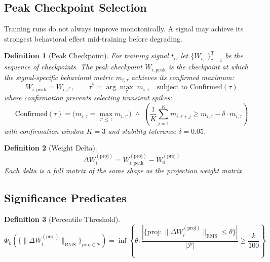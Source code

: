 \documentclass[11pt]{article}
\newtheorem{definition}{Definition}[section]
\begin{document}
\subsection{Peak Checkpoint Selection}

Training runs do not always improve monotonically. A signal may achieve its strongest behavioral effect mid-training before degrading.

\begin{definition}[Peak Checkpoint]
\label{def:peak-checkpoint}
For training signal $t_i$, let $\{W_{i,\tau}\}_{\tau=1}^{T}$ be the sequence of checkpoints. The peak checkpoint $W_{i,\text{peak}}$ is the checkpoint at which the signal-specific behavioral metric $m_{i,\tau}$ achieves its confirmed maximum:
\begin{equation}
W_{i,\text{peak}} = W_{i,\tau^*}, \qquad \tau^* = \arg\max_\tau\; m_{i,\tau} \quad \text{subject to Confirmed}(\tau)
\end{equation}
where confirmation prevents selecting transient spikes:
\begin{equation}
\text{Confirmed}(\tau) = \bigl(m_{i,\tau} = \max_{\tau' \leq \tau} m_{i,\tau'}\bigr) \;\wedge\; \left(\frac{1}{K}\sum_{j=1}^{K} m_{i,\tau+j} \geq m_{i,\tau} - \delta \cdot m_{i,\tau}\right)
\end{equation}
with confirmation window $K=3$ and stability tolerance $\delta = 0.05$.
\end{definition}

\begin{definition}[Weight Delta]
\begin{equation}
\Delta W_i^{(\text{proj})} = W_{i,\text{peak}}^{(\text{proj})} - W_0^{(\text{proj})}
\end{equation}
Each delta is a full matrix of the same shape as the projection weight matrix.
\end{definition}

\subsection{Significance Predicates}

\begin{definition}[Percentile Threshold]
\begin{equation}
\Phi_k(\{\|\Delta W^{(\text{proj})}_i\|_{\text{RMS}}\}_{\text{proj} \in \mathcal{P}}) = \inf\left\{\theta : \frac{|\{\text{proj} : \|\Delta W^{(\text{proj})}_i\|_{\text{RMS}} \leq \theta\}|}{|\mathcal{P}|} \geq \frac{k}{100}\right\}
\end{equation}
\end{definition}
\end{document}
